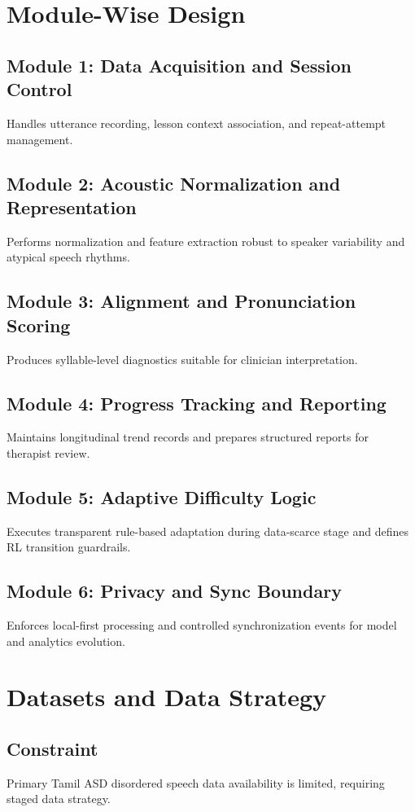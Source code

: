 \documentclass[12pt,a4paper]{article}
\begin{document}
\section{Module-Wise Design}
\subsection{Module 1: Data Acquisition and Session Control}
Handles utterance recording, lesson context association, and repeat-attempt management.

\subsection{Module 2: Acoustic Normalization and Representation}
Performs normalization and feature extraction robust to speaker variability and atypical speech rhythms.

\subsection{Module 3: Alignment and Pronunciation Scoring}
Produces syllable-level diagnostics suitable for clinician interpretation.

\subsection{Module 4: Progress Tracking and Reporting}
Maintains longitudinal trend records and prepares structured reports for therapist review.

\subsection{Module 5: Adaptive Difficulty Logic}
Executes transparent rule-based adaptation during data-scarce stage and defines RL transition guardrails.

\subsection{Module 6: Privacy and Sync Boundary}
Enforces local-first processing and controlled synchronization events for model and analytics evolution.

\section{Datasets and Data Strategy}
\subsection{Constraint}
Primary Tamil ASD disordered speech data availability is limited, requiring staged data strategy.
\end{document}
